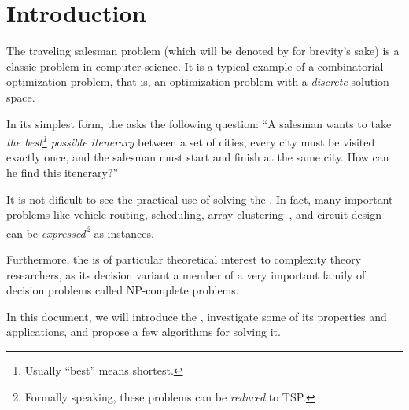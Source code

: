 \chapter*{Introduction}

The traveling salesman problem (which will be denoted by \TSP for brevity's sake) is a classic problem in computer science. It is a typical example of a combinatorial optimization problem, that is, an optimization problem with a \emph{discrete} solution space.

In its simplest form, the \TSP asks the following question: ``A salesman wants to take \emph{the best\footnote{Usually ``best'' means shortest.} possible itenerary} between a set of cities, every city must be visited exactly once, and the salesman must start and finish at the same city. How can he find this itenerary?''

It is not dificult to see the practical use of solving the \TSP. 
In fact, many important problems like vehicle routing, scheduling, array clustering~\cite{tsp-tour}, and circuit design~\cite{tsp-computational-solutions} can be \emph{expressed\footnote{Formally speaking, these problems can be \emph{reduced} to \textsf{TSP.}}} as \TSP instances.

Furthermore, the \TSP is of particular theoretical interest to complexity theory researchers, as its decision variant a member of a very important family of decision problems called \textsf{NP}-complete problems.

In this document, we will introduce the \TSP, investigate some of its properties and applications, and propose a few algorithms for solving it.
